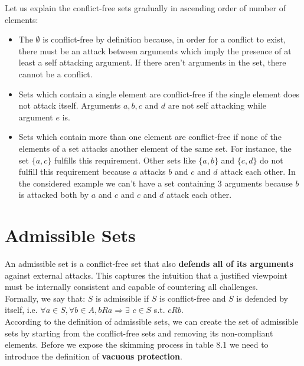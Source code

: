 \documentclass{scrbook}
\begin{document}
Let us explain the conflict-free sets gradually in ascending order of number of elements:

\begin{itemize}
    \item
    The $\emptyset$ is conflict-free by definition because, in order for a conflict to exist, there must be an attack between arguments which imply the presence of at least a self attacking argument. If there aren't arguments in the set, there cannot be a conflict.

    \item 
    Sets which contain a single element are conflict-free if the single element does not attack itself. Arguments $a, b, c$ and $d$ are not self attacking while argument $e$ is.

    \item 
    Sets which contain more than one element are conflict-free if none of the elements of a set attacks another element of the same set. For instance, the set $\{a,c\}$ fulfills this requirement. Other sets like $\{a,b\}$ and $\{c,d\}$ do not fulfill this requirement because $a$ attacks $b$ and $c$ and $d$ attack each other. In the considered example we can't have a set containing 3 arguments because $b$ is attacked both by $a$ and $c$ and $c$ and $d$ attack each other.
\end{itemize}

\section{Admissible Sets}

An admissible set is a conflict-free set that also \textbf{defends all of its arguments} against external attacks. This captures the intuition that a justified viewpoint must be internally consistent and capable of countering all challenges. \\

Formally, we say that: $S$ is admissible if $S$ is conflict-free and $S$ is defended by itself, i.e. $\forall a \in S, \forall b \in A, bRa \Rightarrow \exists$ $c \in S$ s.t. $cRb$. \\

According to the definition of admissible sets, we can create the set of admissible sets by starting from the conflict-free sets and removing its non-compliant elements. Before we expose the skimming process in table 8.1 we need to introduce the definition of \textbf{vacuous protection}. \\
\end{document}
